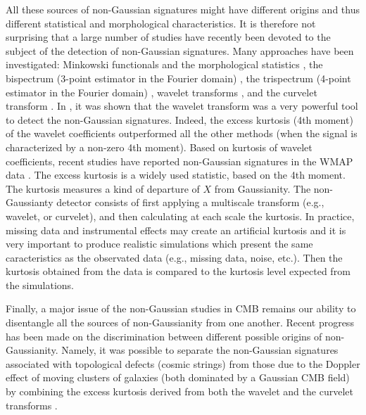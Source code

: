 All these sources of non-Gaussian signatures might have different origins and thus different statistical and morphological
characteristics. It is therefore not surprising that a large number of studies have recently been devoted to the subject 
of the detection of non-Gaussian signatures. Many approaches have been investigated: Minkowski functionals and the morphological 
statistics \cite{gauss:novikov00,gauss:shandarin02}, the bispectrum (3-point estimator in the Fourier domain) 
\cite{gauss:bromley99,gauss:verde00,gauss:phillips01}, the trispectrum (4-point estimator in the Fourier domain) \cite{gauss:kunz01}, 
wavelet transforms \cite{gauss:aghanim99,gauss:forni99,gauss:hobson99,gauss:barreiro01,gauss:cayon01,gauss:jewell01,starck:sta03_1}, 
and the curvelet transform \cite{starck:sta03_1}. In \cite{gauss:aghanim03,starck:sta03_1}, it was shown that the wavelet transform 
was a very powerful tool to detect the non-Gaussian signatures. Indeed, the excess kurtosis (4th moment) of the wavelet coefficients 
outperformed all the other methods (when the signal is characterized by a non-zero 4th moment). Based on kurtosis of wavelet coefficients, 
recent studies have reported non-Gaussian signatures in the WMAP data \cite{gauss:vielva04,gauss:pia04,gauss:cruz05}.
The excess kurtosis is a widely used statistic, based on the 4th moment. 
The kurtosis measures a kind of departure of $X$ from Gaussianity. The non-Gaussianty detector consists of first applying 
a multiscale transform (e.g., wavelet, or curvelet), and then calculating at each scale the kurtosis. In practice, missing 
data and instrumental effects may create an artificial kurtosis and it is very important to produce realistic simulations 
which present the same caracteristics as the observated data (e.g., missing data, noise, etc.). Then the kurtosis obtained 
from the data is compared to the kurtosis level expected from the simulations.
 
Finally, a major issue of the non-Gaussian studies in CMB remains our ability to disentangle all the sources of non-Gaussianity 
from one another. Recent progress has been made on the discrimination between different possible origins of non-Gaussianity. 
Namely, it was possible to separate the non-Gaussian signatures associated with topological defects (cosmic strings) from those 
due to the Doppler effect of moving clusters of galaxies (both dominated by a Gaussian CMB field) by combining the excess kurtosis 
derived from both the wavelet and the curvelet transforms \cite{starck:sta03_1}. 

